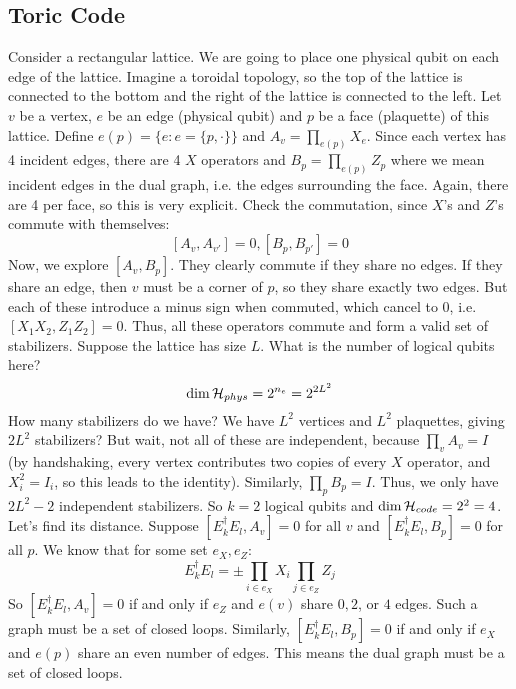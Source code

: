 \subsection{Toric Code}
Consider a rectangular lattice. We are going to place one physical qubit on each edge of the lattice.
Imagine a toroidal topology, so the top of the lattice is connected to the bottom and the right of the lattice is connected to the left.
Let $v$ be a vertex, $e$ be an edge (physical qubit) and $p$ be a face (plaquette) of this lattice. Define $e(p) = \{ e : e = \{p, \cdot\}\}$ and
$A_v = \prod_{e(p)} X_e$. Since each vertex has 4 incident edges, there are 4 $X$ operators and $B_p = \prod_{e(p)} Z_p$
where we mean incident edges in the dual graph, i.e. the edges surrounding the face. Again, there are 4 per face, so this is very explicit.
Check the commutation, since $X$'s and $Z$'s commute with themselves:
\[ [A_v, A_{v'}] = 0, [B_p, B_{p'}] = 0 \]
Now, we explore $[A_v, B_p]$. They clearly commute if they share no edges. If they share an edge, then $v$ must be a corner of $p$,
so they share exactly two edges. But each of these introduce a minus sign when commuted, which cancel to 0, i.e. $[X_1 X_2, Z_1 Z_2] = 0$.
Thus, all these operators commute and form a valid set of stabilizers. Suppose the lattice has size $L$. What is the number of logical qubits here?
\[ \dim \operatorname{\mathcal{H}}_{phys} = 2^{n_e} = 2^{2L^2} \]
How many stabilizers do we have? We have $L^2$ vertices and $L^2$ plaquettes, giving $2L^2$ stabilizers? But wait,
not all of these are independent, because $\prod_v A_v = I$ (by handshaking, every vertex contributes
two copies of every $X$ operator, and $X_i^2 = I_i$, so this leads to the identity). Similarly, $\prod_p B_p = I$. Thus, we only have $2L^2 - 2$ independent
stabilizers. So $k = 2$ logical qubits and $\dim \operatorname{\mathcal{H}}_{code} = 2^2 = 4$. Let's find its distance.
Suppose $[E_k^{\dagger} E_l, A_v] = 0$ for all $v$ and $[E_k^{\dagger} E_l, B_p] = 0$ for all $p$. We know that for some set $e_X, e_Z$:
\[ E_k^{\dagger} E_l = \pm \prod_{i \in e_X} X_i \prod_{j \in e_Z} Z_j \]
So $[E_k^{\dagger} E_l, A_v] = 0$ if and only if $e_Z$ and $e(v)$ share $0, 2$, or $4$ edges.
Such a graph must be a set of closed loops. Similarly, $[E_k^{\dagger} E_l, B_p] = 0$ if and only if $e_X$ and $e(p)$
share an even number of edges. This means the dual graph must be a set of closed loops.
